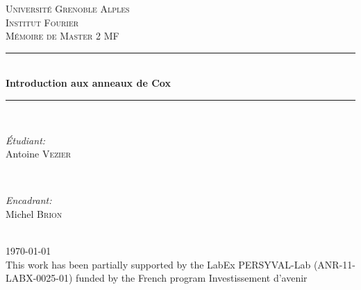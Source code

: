 \documentclass[oneside, 10pt]{book}
\begin{document}
\begin{titlepage}

\newcommand{\HRule}{\rule{\linewidth}{0.5mm}} %

\center

\textsc{\LARGE Université Grenoble Alples}\\[0.5cm] 
\textsc{\large Institut Fourier}\\[1.5cm] 

\textsc{\Large Mémoire de Master 2 MF}\\[2.5cm] 

\HRule \\[0.4cm]
{ \huge \bfseries Introduction aux anneaux de Cox}\\[0.4cm] 
\HRule \\[1.5cm]

\begin{minipage}{0.4\textwidth}
\begin{flushleft} \large
\emph{Étudiant:}\\
Antoine \textsc{Vezier} 
\end{flushleft}
\end{minipage}
~
\begin{minipage}{0.4\textwidth}
\begin{flushright} \large
\emph{Encadrant:} \\
Michel \textsc{Brion} 
\end{flushright}
\end{minipage}\\[2cm]

{\large \today}\\[8cm] 


{\large This work has been partially supported by the LabEx PERSYVAL-Lab (ANR-11-LABX-0025-01) funded by the French program Investissement d’avenir
}\\[1cm] 

 
\vfill %

\end{titlepage}

\tableofcontents






\nocite{*}


\end{document}
